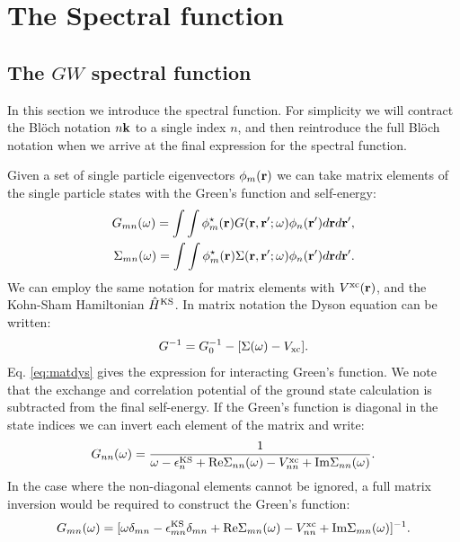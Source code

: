 \section{The Spectral function}
\subsection{The $GW$ spectral function}
\label{sec:spec}
\noindent
In this section we introduce the spectral function. For simplicity we will contract the
Bl\"och notation $n{\bf k}$ to a single index $n$, and then reintroduce the full Bl\"och notation when
we arrive at the final expression for the spectral function.

Given a set of single particle eigenvectors $\phi_{m}({\bf r})$ we can take matrix elements of the
single particle states with the Green's function and self-energy:
%
\begin{eqnarray}
G_{mn}(\omega)       = \int \int \phi_{m}^{\star}({\bf r}) G({\bf r},{\bf r}';\omega) \phi_{n}({\bf r}')  d{\bf r} d{\bf r}', \\
\Sigma_{mn}(\omega)  = \int \int \phi_{m}^{\star}({\bf r}) \Sigma({\bf r},{\bf r}';\omega) \phi_{n}({\bf r}') d{\bf r} d{\bf r}'.
\end{eqnarray}
%
We can employ the same notation for matrix elements with $V^{\rm{xc}}({\bf r})$,
and the Kohn-Sham Hamiltonian $\hat{H}^{\rm{KS}}$.
%
In matrix notation the Dyson equation \cite{inkson} can be written:
%
\begin{equation}
\label{eq:matdys}
G^{-1} = G_{0}^{-1} - [\Sigma(\omega) - V_{\rm{xc}}].
\end{equation}
%
Eq. \ref{eq:matdys} gives the expression for interacting Green's function.
We note that the exchange and correlation potential of the ground state
calculation is subtracted from the final self-energy. If the Green's function is diagonal
in the state indices we can invert each element of the matrix and write:
%
\begin{equation}
G_{nn}(\omega) = \frac{1}{\omega -\epsilon^{\rm{KS}}_{n}+{\rm Re}\Sigma_{nn}(\omega)-V^{\rm{xc}}_{nn}+{\rm Im}\Sigma_{nn}(\omega)}.
\end{equation}
%
In the case where the non-diagonal elements cannot be ignored,
a full matrix inversion would be required to construct the Green's function:
%
\begin{equation}
G_{mn}(\omega) = [\omega \delta_{mn} - \epsilon^{\rm{KS}}_{mn}\delta_{mn} + {\rm Re}\Sigma_{mn}(\omega) - V^{\rm{xc}}_{nn} + {\rm Im}\Sigma_{mn}(\omega)]^{-1}.
\end{equation}

